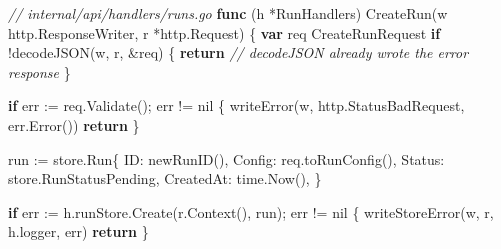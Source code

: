 \documentclass[
]{article}
\newenvironment{Shaded}{}{}
\newcommand{\CommentTok}[1]{\textcolor[rgb]{0.38,0.63,0.69}{\textit{#1}}}
\newcommand{\ControlFlowTok}[1]{\textcolor[rgb]{0.00,0.44,0.13}{\textbf{#1}}}
\newcommand{\KeywordTok}[1]{\textcolor[rgb]{0.00,0.44,0.13}{\textbf{#1}}}
\newcommand{\NormalTok}[1]{#1}
\newcommand{\OperatorTok}[1]{\textcolor[rgb]{0.40,0.40,0.40}{#1}}
\newcommand{\OtherTok}[1]{\textcolor[rgb]{0.00,0.44,0.13}{#1}}
\begin{document}
\begin{Shaded}
\begin{Highlighting}[]
\CommentTok{// internal/api/handlers/runs.go}
\KeywordTok{func} \OperatorTok{(}\NormalTok{h }\OperatorTok{*}\NormalTok{RunHandlers}\OperatorTok{)}\NormalTok{ CreateRun}\OperatorTok{(}\NormalTok{w http}\OperatorTok{.}\NormalTok{ResponseWriter}\OperatorTok{,}\NormalTok{ r }\OperatorTok{*}\NormalTok{http}\OperatorTok{.}\NormalTok{Request}\OperatorTok{)} \OperatorTok{\{}
    \KeywordTok{var}\NormalTok{ req CreateRunRequest}
    \ControlFlowTok{if} \OperatorTok{!}\NormalTok{decodeJSON}\OperatorTok{(}\NormalTok{w}\OperatorTok{,}\NormalTok{ r}\OperatorTok{,} \OperatorTok{\&}\NormalTok{req}\OperatorTok{)} \OperatorTok{\{}
        \ControlFlowTok{return} \CommentTok{// decodeJSON already wrote the error response}
    \OperatorTok{\}}

    \ControlFlowTok{if}\NormalTok{ err }\OperatorTok{:=}\NormalTok{ req}\OperatorTok{.}\NormalTok{Validate}\OperatorTok{();}\NormalTok{ err }\OperatorTok{!=} \OtherTok{nil} \OperatorTok{\{}
\NormalTok{        writeError}\OperatorTok{(}\NormalTok{w}\OperatorTok{,}\NormalTok{ http}\OperatorTok{.}\NormalTok{StatusBadRequest}\OperatorTok{,}\NormalTok{ err}\OperatorTok{.}\NormalTok{Error}\OperatorTok{())}
        \ControlFlowTok{return}
    \OperatorTok{\}}

\NormalTok{    run }\OperatorTok{:=}\NormalTok{ store}\OperatorTok{.}\NormalTok{Run}\OperatorTok{\{}
\NormalTok{        ID}\OperatorTok{:}\NormalTok{        newRunID}\OperatorTok{(),}
\NormalTok{        Config}\OperatorTok{:}\NormalTok{    req}\OperatorTok{.}\NormalTok{toRunConfig}\OperatorTok{(),}
\NormalTok{        Status}\OperatorTok{:}\NormalTok{    store}\OperatorTok{.}\NormalTok{RunStatusPending}\OperatorTok{,}
\NormalTok{        CreatedAt}\OperatorTok{:}\NormalTok{ time}\OperatorTok{.}\NormalTok{Now}\OperatorTok{(),}
    \OperatorTok{\}}

    \ControlFlowTok{if}\NormalTok{ err }\OperatorTok{:=}\NormalTok{ h}\OperatorTok{.}\NormalTok{runStore}\OperatorTok{.}\NormalTok{Create}\OperatorTok{(}\NormalTok{r}\OperatorTok{.}\NormalTok{Context}\OperatorTok{(),}\NormalTok{ run}\OperatorTok{);}\NormalTok{ err }\OperatorTok{!=} \OtherTok{nil} \OperatorTok{\{}
\NormalTok{        writeStoreError}\OperatorTok{(}\NormalTok{w}\OperatorTok{,}\NormalTok{ r}\OperatorTok{,}\NormalTok{ h}\OperatorTok{.}\NormalTok{logger}\OperatorTok{,}\NormalTok{ err}\OperatorTok{)}
        \ControlFlowTok{return}
    \OperatorTok{\}}


\end{Highlighting}
\end{Shaded}
\end{document}
